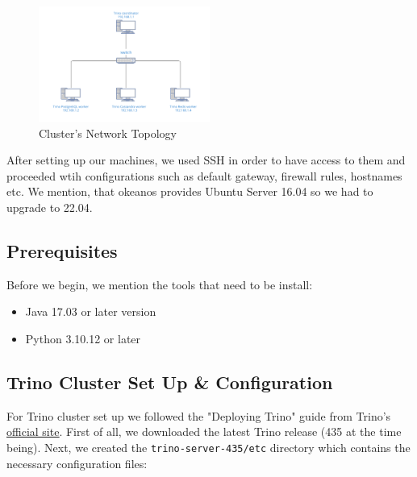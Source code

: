 \documentclass[conference]{IEEEtran}
\begin{document}
\begin{figure}[h]
    \centering
    \includegraphics[width=0.5\textwidth]{images/LAN.png}
    \caption{Cluster's Network Topology}
    \label{fig:LAN}
\end{figure}

After setting up our machines, we used SSH in order to have access to them and proceeded wtih configurations
such as default gateway, firewall rules, hostnames etc. We mention, that okeanos provides Ubuntu Server 16.04 so
we had to upgrade to 22.04.

\subsection{Prerequisites}

Before we begin, we mention the tools that need to be install:

\begin{itemize}
    \item {Java 17.03 or later version}
    \item {Python 3.10.12 or later}
\end{itemize}

\subsection{Trino Cluster Set Up \& Configuration}

For Trino cluster set up we followed the "Deploying Trino" guide from Trino's \textcolor{linkblue}{\underline{\href{https://trino.io/docs/current/installation/deployment.html}{official site}}}.
First of all, we downloaded the latest Trino release (435 at the time being). Next, we created the \texttt{trino-server-435/etc} directory which contains the necessary configuration files:
\end{document}
